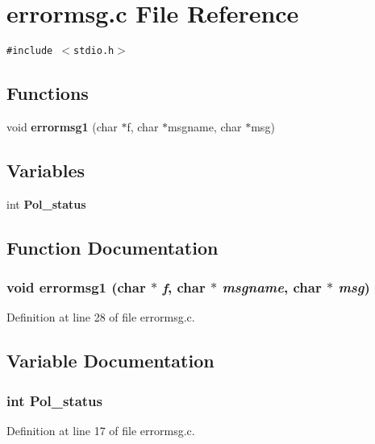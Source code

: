 \section{errormsg.c File Reference}
\label{errormsg_8c}
{\tt \#include $<$stdio.h$>$}\par
\subsection*{Functions}
\begin{CompactItemize}
\item 
void {\bf errormsg1} (char $\ast$f, char $\ast$msgname, char $\ast$msg)
\end{CompactItemize}
\subsection*{Variables}
\begin{CompactItemize}
\item 
int {\bf Pol\_\-status}
\end{CompactItemize}


\subsection{Function Documentation}
\subsubsection{\setlength{\rightskip}{0pt plus 5cm}void errormsg1 (char $\ast$ {\em f}, char $\ast$ {\em msgname}, char $\ast$ {\em msg})}\label{errormsg_8c_a1}




Definition at line 28 of file errormsg.c.

\subsection{Variable Documentation}
\subsubsection{\setlength{\rightskip}{0pt plus 5cm}int Pol\_\-status}\label{errormsg_8c_a0}




Definition at line 17 of file errormsg.c.